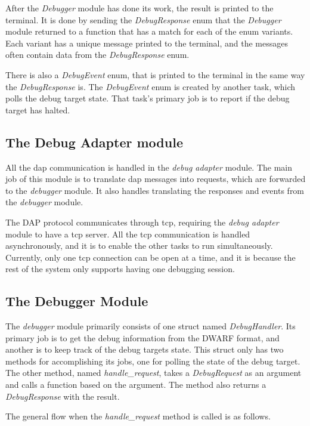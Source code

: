 After the \emph{Debugger} module has done its work, the result is printed to the terminal.
It is done by sending the \emph{DebugResponse} enum that the \emph{Debugger} module returned to a function that has a match for each of the enum variants.
Each variant has a unique message printed to the terminal, and the messages often contain data from the \emph{DebugResponse} enum.


There is also a \emph{DebugEvent} enum, that is printed to the terminal in the same way the \emph{DebugResponse} is.
The \emph{DebugEvent} enum is created by another task, which polls the debug target state.
That task's primary job is to report if the debug target has halted.



\subsection{The Debug Adapter module}
All the \gls{dap} communication is handled in the \emph{debug adapter} module.
The main job of this module is to translate \gls{dap} messages into requests, which are forwarded to the \emph{debugger} module.
It also handles translating the responses and events from the \emph{debugger} module.


The DAP protocol communicates through \gls{tcp}, requiring the \emph{debug adapter} module to have a \gls{tcp} server.
All the \gls{tcp} communication is handled asynchronously, and it is to enable the other tasks to run simultaneously.
Currently, only one \gls{tcp} connection can be open at a time, and it is because the rest of the system only supports having one debugging session.


\subsection{The Debugger Module}
The \emph{debugger} module primarily consists of one struct named \emph{DebugHandler}.
Its primary job is to get the debug information from the \gls{DWARF} format, and another is to keep track of the debug targets state.
This struct only has two methods for accomplishing its jobs, one for polling the state of the debug target.
The other method, named \emph{handle\_request}, takes a \emph{DebugRequest} as an argument and calls a function based on the argument.
The method also returns a \emph{DebugResponse} with the result.


The general flow when the \emph{handle\_request} method is called is as follows.


